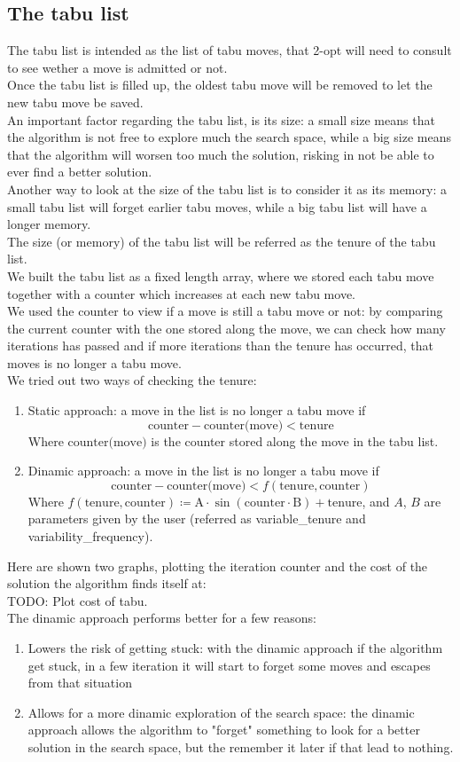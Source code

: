 \subsection{The tabu list}
The tabu list is intended as the list of tabu moves, that 2-opt will need to consult to see wether a move is admitted or not.\\
Once the tabu list is filled up, the oldest tabu move will be removed to let the new tabu move be saved.\\
An important factor regarding the tabu list, is its size: a small size means that the algorithm is not free to explore much the search space, while a big size means that the algorithm will worsen too much the solution, risking in not be able to ever find a better solution.\\
Another way to look at the size of the tabu list is to consider it as its memory: a small tabu list will forget earlier tabu moves, while a big tabu list will have a longer memory.\\
The size (or memory) of the tabu list will be referred as the tenure of the tabu list.\\
We built the tabu list as a fixed length array, where we stored each tabu move together with a counter which increases at each new tabu move.\\
We used the counter to view if a move is still a tabu move or not: by comparing the current counter with the one stored along the move, we can check how many iterations has passed and if more iterations than the tenure has occurred, that moves is no longer a tabu move.\\
We tried out two ways of checking the tenure:
\begin{enumerate}
    \item Static approach: a move in the list is no longer a tabu move if
    $$\text{counter}-\text{counter(move)} < \text{tenure}$$
    Where $\text{counter(move)}$ is the counter stored along the move in the tabu list.
    \item Dinamic approach: a move in the list is no longer a tabu move if
    $$\text{counter}-\text{counter(move)} < f(\text{tenure}, \text{counter})$$
    Where $f(\text{tenure},\text{counter})\coloneq \text{A}\cdot\sin(\text{counter}\cdot\text{B}) + \text{tenure}$, and $A$, $B$ are parameters given by the user (referred as variable\_tenure and variability\_frequency).
\end{enumerate}
Here are shown two graphs, plotting the iteration counter and the cost of the solution the algorithm finds itself at:\\
TODO: Plot cost of tabu.\\
The dinamic approach performs better for a few reasons:
\begin{enumerate}
    \item Lowers the risk of getting stuck: with the dinamic approach if the algorithm get stuck, in a few iteration it will start to forget some moves and escapes from that situation
    \item Allows for a more dinamic exploration of the search space: the dinamic approach allows the algorithm to "forget" something to look for a better solution in the search space, but the remember it later if that lead to nothing.
\end{enumerate}
